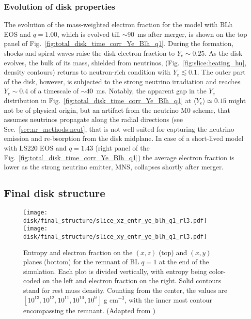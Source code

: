 \subsubsection*{Evolution of disk properties}

The evolution of the mass-weighted electron fraction for the model with
BLh \ac{EOS} and $q=1.00$, which is evolved till $\sim 90$~ms after merger, 
is shown on the top panel of Fig.~\ref{fig:total_disk_time_corr_Ye_Blh_q1}.
%
During the formation, shocks and spiral waves raise the disk electron fraction to
$Y_e\sim0.25$. As the disk evolves, the bulk of its mass, shielded from neutrinos, 
(Fig.~\ref{fig:slice:heating_hu}, density contours) returns to neutron-rich 
condition with $Y_e\lesssim0.1$. The outer part of the disk, however, is 
subjected to the strong neutrino irradiation and reaches $Y_e\sim0.4$ of a 
timescale of ${\sim}40$~ms.
Notably, the apparent gap in the $Y_e$ distribution in 
Fig.~\ref{fig:total_disk_time_corr_Ye_Blh_q1} at $\langle Y_e \rangle \simeq 0.15$ 
might not be of physical origin, but an artifact from the neutrino M0 scheme, 
that assumes neutrinos propagate along the radial directions
(see Sec.~\ref{sec:nr_methods:neut}, that is not well suited for capturing the 
neutrino emission and re-bsorption from the disk midplane.
%
In case of a short-lived model with LS220 \ac{EOS} and $q=1.43$ 
(right panel of the Fig.~\ref{fig:total_disk_time_corr_Ye_Blh_q1})
the average electron fraction is lower as the strong neutrino emitter,
\ac{MNS}, collapses shortly after merger. 
%




\subsection{Final disk structure}

\begin{figure}[t]
    \centering
    \texttt{[image: disk/final\_structure/slice\_xz\_entr\_ye\_blh\_q1\_rl3.pdf]}
    \texttt{[image: disk/final\_structure/slice\_xy\_entr\_ye\_blh\_q1\_rl3.pdf]}
    \caption{Entropy and electron fraction on the $(x,z)$ (top) and
        $(x,y)$ planes (bottom) for the remnant of BL $q=1$ at the end
        of the simulation. Each plot is divided vertically, with entropy
        being color-coded on the left and electron fraction on the
        right. Solid contours stand for rest muss density. Counting from
        the center, the values are $[10^{13}, 10^{12}, 10^{11}, 10^{10},
        10^{9}]$ g cm$^{-3}$, with the inner most contour encompassing
        the remnant.
        (Adapted from \citet{Nedora:2020pak})
    }  
    \label{fig:snapshots_xy_ye_entr}
\end{figure}

